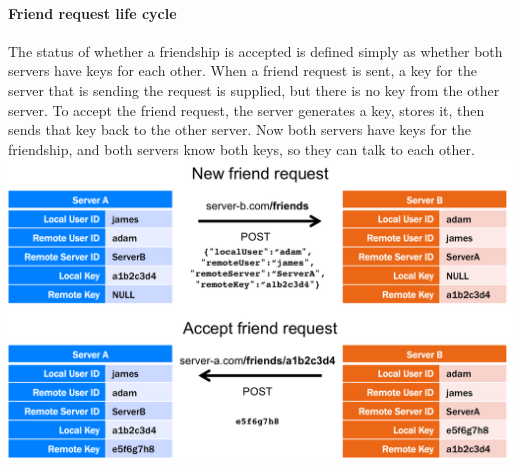 \paragraph{Friend request life cycle}
The status of whether a friendship is accepted is defined simply as whether both servers have keys for each other.
When a friend request is sent, a key for the server that is sending the request is supplied, but there is no key from the other server. To accept the friend request, the server generates a key, stores it, then sends that key back to the other server.
Now both servers have keys for the friendship, and both servers know both keys, so they can talk to each other.
\\
\includegraphics[scale=0.85]{img/FriendshipRESTCycle.png} 
